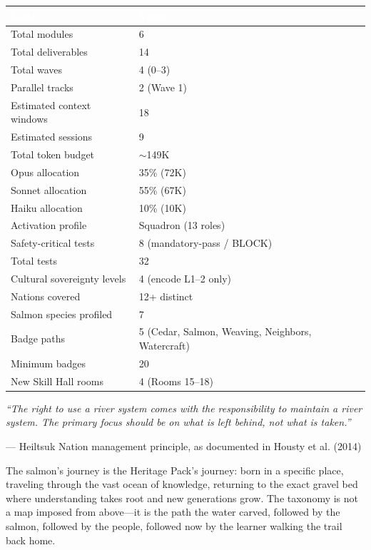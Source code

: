 \documentclass[11pt,letterpaper]{article}
\newcommand{\tableheader}[1]{\textbf{\sffamily\textcolor{white}{#1}}}
\begin{document}
\begin{center}
\begin{tabularx}{\textwidth}{L{5cm}X}
\toprule
{}
\tableheader{Metric} & \tableheader{Value} \\
\midrule
Total modules & 6 \\
Total deliverables & 14 \\
Total waves & 4 (0--3) \\
Parallel tracks & 2 (Wave 1) \\
Estimated context windows & 18 \\
Estimated sessions & 9 \\
Total token budget & $\sim$149K \\
Opus allocation & 35\% (72K) \\
Sonnet allocation & 55\% (67K) \\
Haiku allocation & 10\% (10K) \\
Activation profile & Squadron (13 roles) \\
Safety-critical tests & 8 (mandatory-pass / BLOCK) \\
Total tests & 32 \\
Cultural sovereignty levels & 4 (encode L1--2 only) \\
Nations covered & 12+ distinct \\
Salmon species profiled & 7 \\
Badge paths & 5 (Cedar, Salmon, Weaving, Neighbors, Watercraft) \\
Minimum badges & 20 \\
New Skill Hall rooms & 4 (Rooms 15--18) \\
\bottomrule
\end{tabularx}
\end{center}

\vspace{1em}

\begin{quotebox}
\textit{``The right to use a river system comes with the responsibility to maintain a river system. The primary focus should be on what is left behind, not what is taken.''}

\vspace{0.5em}
--- Heiltsuk Nation management principle, as documented in Housty et al. (2014)

\vspace{1em}
The salmon's journey is the Heritage Pack's journey: born in a specific place, traveling through the vast ocean of knowledge, returning to the exact gravel bed where understanding takes root and new generations grow. The taxonomy is not a map imposed from above---it is the path the water carved, followed by the salmon, followed by the people, followed now by the learner walking the trail back home.
\end{quotebox}
\end{document}
